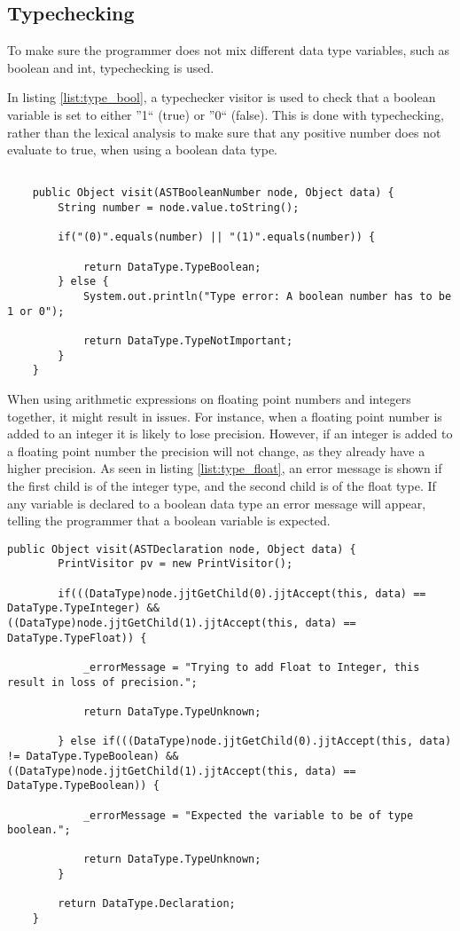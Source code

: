 \subsection{Typechecking}
To make sure the programmer does not mix different data type variables, such as boolean and int, typechecking is used.

In listing \ref{list:type_bool}, a typechecker visitor is used to check that a boolean variable is set to either ''1`` (true) or ''0`` (false). This is done with typechecking, rather than the lexical analysis to make sure that any positive number does not evaluate to true, when using a boolean data type.
\begin{lstlisting}[caption=Verifies/falsifies whether a boolean variable is 0 or 1, label=list:type_bool]

    public Object visit(ASTBooleanNumber node, Object data) {
    	String number = node.value.toString();

		if("(0)".equals(number) || "(1)".equals(number)) {
			
			return DataType.TypeBoolean;
		} else {
			System.out.println("Type error: A boolean number has to be 1 or 0");
			
			return DataType.TypeNotImportant;
		}	 
    }
\end{lstlisting}

When using arithmetic expressions on floating point numbers and integers together, it might result in issues. For instance, when a floating point number is added to an integer it is likely to lose precision. However, if an integer is added to a floating point number the precision will not change, as they already have a higher precision. As seen in listing \ref{list:type_float}, an error message is shown if the first child is of the integer type, and the second child is of the float type. If any variable is declared to a boolean data type an error message will appear, telling the programmer that a boolean variable is expected.

\begin{lstlisting}[caption=Checks if float is being added to an integer\, and if a non-boolean type is set to a boolean value, label=list:type_float]
	public Object visit(ASTDeclaration node, Object data) {
		PrintVisitor pv = new PrintVisitor();

		if(((DataType)node.jjtGetChild(0).jjtAccept(this, data) == DataType.TypeInteger) && ((DataType)node.jjtGetChild(1).jjtAccept(this, data) == DataType.TypeFloat)) {

			_errorMessage = "Trying to add Float to Integer, this result in loss of precision.";

			return DataType.TypeUnknown;

		} else if(((DataType)node.jjtGetChild(0).jjtAccept(this, data) != DataType.TypeBoolean) && ((DataType)node.jjtGetChild(1).jjtAccept(this, data) == DataType.TypeBoolean)) {

			_errorMessage = "Expected the variable to be of type boolean.";

			return DataType.TypeUnknown;
		}

		return DataType.Declaration;
	}
\end{lstlisting}

